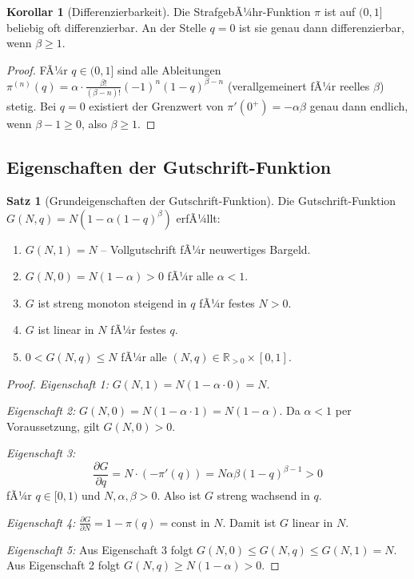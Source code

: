 ﻿\documentclass[a4paper,12pt]{article}
\theoremstyle{definition}
\newtheorem{satz}{Satz}
\newtheorem{korollar}{Korollar}
\begin{document}
\begin{korollar}[Differenzierbarkeit]
Die StrafgebÃ¼hr-Funktion $\pi$ ist auf $(0,1]$ beliebig oft differenzierbar.
An der Stelle $q = 0$ ist sie genau dann differenzierbar, wenn $\beta \geq 1$.
\end{korollar}

\begin{proof}
FÃ¼r $q \in (0,1]$ sind alle Ableitungen $\pi^{(n)}(q) = \alpha \cdot
\frac{\beta!}{(\beta-n)!}(-1)^n(1-q)^{\beta-n}$ (verallgemeinert fÃ¼r reelles $\beta$)
stetig.  Bei $q = 0$ existiert der Grenzwert von $\pi'(0^+) = -\alpha\beta$
genau dann endlich, wenn $\beta - 1 \geq 0$, also $\beta \geq 1$.
\end{proof}

\subsection{Eigenschaften der Gutschrift-Funktion}

\begin{satz}[Grundeigenschaften der Gutschrift-Funktion]
\label{satz:gutt}
Die Gutschrift-Funktion $G(N,q) = N(1 - \alpha(1-q)^{\beta})$ erfÃ¼llt:
\begin{enumerate}
  \item $G(N, 1) = N$ -- Vollgutschrift fÃ¼r neuwertiges Bargeld.
  \item $G(N, 0) = N(1-\alpha) > 0$ fÃ¼r alle $\alpha < 1$.
  \item $G$ ist streng monoton steigend in $q$ fÃ¼r festes $N > 0$.
  \item $G$ ist linear in $N$ fÃ¼r festes $q$.
  \item $0 < G(N,q) \leq N$ fÃ¼r alle $(N,q) \in \mathbb{R}_{>0} \times [0,1]$.
\end{enumerate}
\end{satz}

\begin{proof}
\emph{Eigenschaft 1:} $G(N,1) = N(1 - \alpha \cdot 0) = N$.

\emph{Eigenschaft 2:} $G(N,0) = N(1 - \alpha \cdot 1) = N(1-\alpha)$.
Da $\alpha < 1$ per Voraussetzung, gilt $G(N,0) > 0$.

\emph{Eigenschaft 3:}
\[
\frac{\partial G}{\partial q} = N \cdot (-\pi'(q)) = N \alpha \beta (1-q)^{\beta-1} > 0
\]
fÃ¼r $q \in [0,1)$ und $N, \alpha, \beta > 0$.  Also ist $G$ streng wachsend in $q$.

\emph{Eigenschaft 4:}
$\frac{\partial G}{\partial N} = 1 - \pi(q) = \text{const}$ in $N$.
Damit ist $G$ linear in $N$.

\emph{Eigenschaft 5:}
Aus Eigenschaft 3 folgt $G(N,0) \leq G(N,q) \leq G(N,1) = N$.
Aus Eigenschaft 2 folgt $G(N,q) \geq N(1-\alpha) > 0$.
\end{proof}
\end{document}
